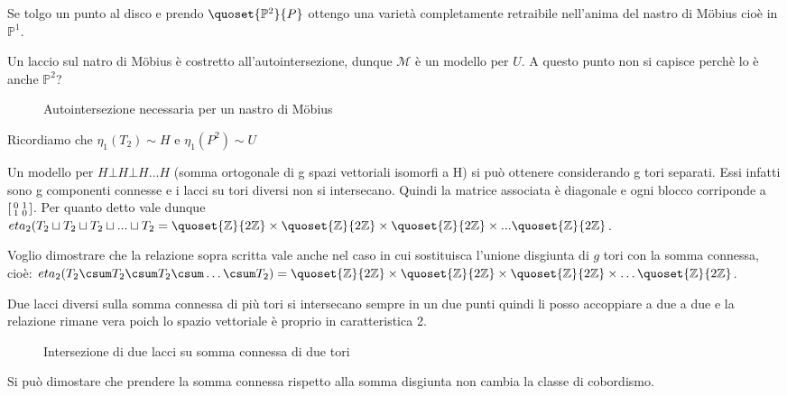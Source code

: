 Se tolgo un punto al disco e prendo $\quoset{\mathbb P^2}{P}$ ottengo una varietà completamente retraibile nell'anima del nastro di Möbius cioè in $\mathbb{P}^1$.

Un laccio sul natro di Möbius è costretto all'autointersezione, dunque $\mathcal{M}$ è un modello per $U$. A questo punto non si capisce perchè lo è anche $\mathbb P^2$?

\begin{figure}
	\centering 
	
	\caption{Autointersezione necessaria per un nastro di Möbius}
\end{figure}

Ricordiamo che $\eta_1(T_{2}) \sim H$ e $\eta_1(P^{2}) \sim U$


Un modello per $H \bot H \bot H ... H$ (somma ortogonale di g spazi vettoriali isomorfi a H) si può ottenere considerando g tori separati. Essi infatti sono g componenti connesse e i lacci su tori diversi non si intersecano. Quindi la matrice associata è diagonale e ogni blocco corriponde a $\begin{bsmallmatrix} 0 & 1 \\ 1 & 0 \end{bsmallmatrix}$.
Per quanto detto vale dunque $eta_{2}(T_{2} \sqcup T_{2} \sqcup T_{2} \sqcup ... \sqcup T_{2} = \quoset{\mathbb{Z}}{2\mathbb{Z}} \times \quoset{\mathbb{Z}}{2\mathbb{Z}} \times \quoset{\mathbb{Z}}{2\mathbb{Z}} \times ... \quoset{\mathbb{Z}}{2\mathbb{Z}}$.

Voglio dimostrare che la relazione sopra scritta vale anche nel caso in cui sostituisca l'unione disgiunta di $g$ tori con la somma connessa, cioè: $eta_{2}(T_{2} \csum T_{2} \csum T_{2} \csum \dots \csum T_{2}) = \quoset{\mathbb{Z}}{2\mathbb{Z}} \times \quoset{\mathbb{Z}}{2\mathbb{Z}} \times \quoset{\mathbb{Z}}{2\mathbb{Z}} \times \dots \quoset{\mathbb{Z}}{2\mathbb{Z}}$.

Due lacci diversi sulla somma connessa di più tori si intersecano sempre in un due punti quindi li posso accoppiare a due a due e la relazione rimane vera poich lo spazio vettoriale è proprio in caratteristica 2.

\begin{figure}
	\centering 
	
	\caption{Intersezione di due lacci su somma connessa di due tori}
\end{figure}

Si può dimostare che prendere la somma connessa rispetto alla somma disgiunta non cambia la classe di cobordismo. 

